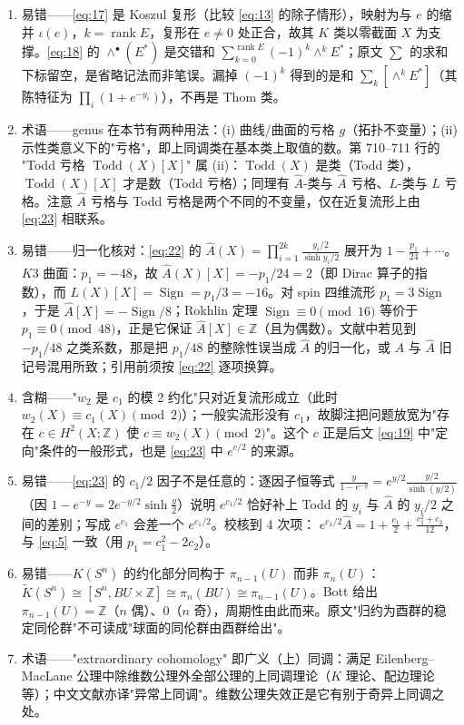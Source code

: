 \documentclass[11pt]{amsart}
\theoremstyle{definition}
\theoremstyle{remark}
\theoremstyle{plain}
\numberwithin{equation}{section}
\renewcommand{\:}{\colon}
\newcommand{\Ahat}{{\hat A}}
\newcommand{\ZZ}{{\mathbb Z}}
\DeclareMathOperator{\rank}{rank}
\DeclareMathOperator{\Sign}{Sign}
\DeclareMathOperator{\Todd}{Todd}
\begin{document}
\begin{enumerate}[leftmargin=2.2em,itemsep=2pt,topsep=2pt]
  \item 易错——\eqref{eq:17} 是 Koszul 复形（比较 \eqref{eq:13} 的除子情形），映射为与 $e$ 的缩并 $\iota(e)$，$k=\rank E$，复形在 $e\ne0$ 处正合，故其 $K$ 类以零截面 $X$ 为支撑。\eqref{eq:18} 的 $\wedge^\bullet(E^*)$ 是交错和 $\sum_{k=0}^{\rank E}(-1)^k\wedge^kE^*$；原文 $\sum\limits_{}$ 的求和下标留空，是省略记法而非笔误。漏掉 $(-1)^k$ 得到的是和 $\sum_k[\wedge^kE^*]$（其陈特征为 $\prod_i(1+e^{-y_i})$），不再是 Thom 类。
  \item 术语——genus 在本节有两种用法：(i) 曲线/曲面的亏格 $g$（拓扑不变量）；(ii) 示性类意义下的"亏格"，即上同调类在基本类上取值的数。第 710–711 行的 "Todd 亏格 $\Todd(X)[X]$" 属 (ii)：$\Todd(X)$ 是类（Todd 类），$\Todd(X)[X]$ 才是数（Todd 亏格）；同理有 $\Ahat$-类与 $\Ahat$ 亏格、$L$-类与 $L$ 亏格。注意 $\Ahat$ 亏格与 Todd 亏格是两个不同的不变量，仅在近复流形上由 \eqref{eq:23} 相联系。
  \item 易错——归一化核对：\eqref{eq:22} 的 $\Ahat(X)=\prod_{i=1}^{2k}\frac{y_i/2}{\sinh y_i/2}$ 展开为 $1-\frac{p_1}{24}+\cdots$。$K3$ 曲面：$p_1=-48$，故 $\Ahat(X)[X]=-p_1/24=2$（即 Dirac 算子的指数），而 $L(X)[X]=\Sign=p_1/3=-16$。对 spin 四维流形 $p_1=3\Sign$，于是 $\Ahat[X]=-\Sign/8$；Rokhlin 定理 $\Sign\equiv0\pmod{16}$ 等价于 $p_1\equiv0\pmod{48}$，正是它保证 $\Ahat[X]\in\ZZ$（且为偶数）。文献中若见到 $-p_1/48$ 之类系数，那是把 $p_1/48$ 的整除性误当成 $\Ahat$ 的归一化，或 $A$ 与 $\Ahat$ 旧记号混用所致；引用前须按 \eqref{eq:22} 逐项换算。
  \item 含糊——"$w_2$ 是 $c_1$ 的模 2 约化"只对近复流形成立（此时 $w_2(X)\equiv c_1(X)\pmod2$）；一般实流形没有 $c_1$，故脚注把问题放宽为"存在 $c\in H^2(X;\ZZ)$ 使 $c\equiv w_2(X)\pmod2$"。这个 $c$ 正是后文 \eqref{eq:19} 中"定向"条件的一般形式，也是 \eqref{eq:23} 中 $e^{c/2}$ 的来源。
  \item 易错——\eqref{eq:23} 的 $c_1/2$ 因子不是任意的：逐因子恒等式 $\frac{y}{1-e^{-y}}=e^{y/2}\frac{y/2}{\sinh(y/2)}$（因 $1-e^{-y}=2e^{-y/2}\sinh\frac y2$）说明 $e^{c_1/2}$ 恰好补上 Todd 的 $y_i$ 与 $\Ahat$ 的 $y_i/2$ 之间的差别；写成 $e^{c_1}$ 会差一个 $e^{c_1/2}$。校核到 4 次项： $e^{c_1/2}\Ahat=1+\frac{c_1}{2}+\frac{c_1^2+c_2}{12}$，与 \eqref{eq:5} 一致（用 $p_1=c_1^2-2c_2$）。
  \item 易错——$K(S^n)$ 的约化部分同构于 $\pi_{n-1}(U)$ 而非 $\pi_n(U)$： $\tilde K(S^n)\cong[S^n,BU\times\ZZ]\cong\pi_n(BU)\cong\pi_{n-1}(U)$。Bott 给出 $\pi_{n-1}(U)=\ZZ$（$n$ 偶）、$0$（$n$ 奇），周期性由此而来。原文"归约为酉群的稳定同伦群"不可读成"球面的同伦群由酉群给出"。
  \item 术语——"extraordinary cohomology" 即广义（上）同调：满足 Eilenberg–MacLane 公理中除维数公理外全部公理的上同调理论（$K$ 理论、配边理论等）；中文文献亦译"异常上同调"。维数公理失效正是它有别于奇异上同调之处。

\end{enumerate}
\end{document}
